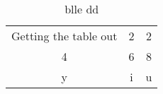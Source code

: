 \begin{table} 
    \begin{tabular}{ c c c }
        Getting the table out & 2 & 2 \\ 
        4 & 6 & 8 \\ 
        y & i & u \\ 
    \end{tabular} 
    \caption{blle
dd} 
\end{table}